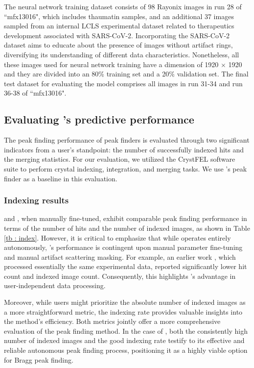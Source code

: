 \documentclass[a4paper]{article}
\begin{document}
The neural network training dataset consists of 98 Rayonix images in run 28 of ``mfx13016", which includes thaumatin samples, and an additional 37 images sampled from an internal LCLS experimental dataset related to therapeutics development associated with SARS-CoV-2.  Incorporating the SARS-CoV-2 dataset aims to educate \peaknet{} about the presence of images without artifact rings, diversifying its understanding of different data characteristics.  Nonetheless, all these images used for neural network training have a dimension of 1920 $\times$ 1920 and they are divided into an 80\% training set and a 20\% validation set.  The final test dataset for evaluating the model comprises all images in run 31-34 and run 36-38 of ``mfx13016".


\subsection{Evaluating \peaknet{}'s predictive performance}

The peak finding performance of peak finders is evaluated through two significant indicators from a user's standpoint: the number of successfully indexed hits and the merging statistics.  For our evaluation, we utilized the CrystFEL software suite \citep{whiteCrystFELSoftwareSuite2012} to perform crystal indexing, integration, and merging tasks.  We use \psocake{}'s peak finder as a baseline in this evaluation.

\subsubsection{Indexing results}

\peaknet{} and \psocake{}, when manually fine-tuned, exhibit comparable peak finding performance in terms of the number of hits and the number of indexed images, as shown in Table \ref{tb : index}.  However, it is critical to emphasize that while \peaknet{} operates entirely autonomously, \psocake{}'s performance is contingent upon manual parameter fine-tuning and manual artifact scattering masking.  For example, an earlier work \citep{suSerialCrystallographyUsing2021}, which processed essentially the same experimental data, reported significantly lower hit count and indexed image count.  Consequently, this highlights \peaknet{}'s advantage in user-independent data processing.

Moreover, while users might prioritize the absolute number of indexed images as a more straightforward metric, the indexing rate provides valuable insights into the method's efficiency.  Both metrics jointly offer a more comprehensive evaluation of the peak finding method. In the case of \peaknet{}, both the consistently high number of indexed images and the good indexing rate testify to its effective and reliable autonomous peak finding process, positioning it as a highly viable option for Bragg peak finding.
\end{document}

